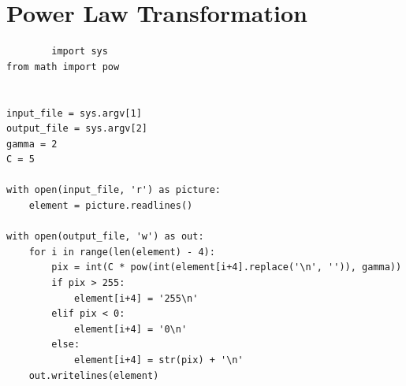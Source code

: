 \documentclass[a4paper,8pt]{article}
\begin{document}
        \section{Power Law Transformation}
        \begin{verbatim}
        import sys
from math import pow


input_file = sys.argv[1]
output_file = sys.argv[2]
gamma = 2
C = 5

with open(input_file, 'r') as picture:
    element = picture.readlines()

with open(output_file, 'w') as out:
    for i in range(len(element) - 4):
        pix = int(C * pow(int(element[i+4].replace('\n', '')), gamma))
        if pix > 255:
            element[i+4] = '255\n'
        elif pix < 0:
            element[i+4] = '0\n'
        else:
            element[i+4] = str(pix) + '\n'
    out.writelines(element)


        \end{verbatim}
        
\end{document}
